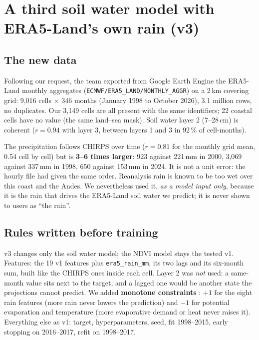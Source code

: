 \documentclass[11pt,a4paper]{article}
\begin{document}
\section{A third soil water model with ERA5-Land's own rain (v3)}\label{sec:v3}

\subsection{The new data}
Following our request, the team exported from Google Earth Engine the ERA5-Land monthly aggregates
(\texttt{ECMWF/ERA5\_LAND/MONTHLY\_AGGR}) on a 2\,km covering grid: 9,016 cells $\times$ 346 months (January 1998 to October
2026), 3.1 million rows, no duplicates. Our 3,149 cells are all present with the same identifiers; 22 coastal cells have no
value (the same land--sea mask). Soil water layer 2 (7--28\,cm) is coherent ($r=0.94$ with layer 3, between layers 1 and 3 in
92\,\% of cell-months).

The precipitation follows CHIRPS over time ($r=0.81$ for the monthly grid mean, 0.54 cell by cell) but is \textbf{3--6 times
larger}: 923 against 221\,mm in 2000, 3,069 against 337\,mm in 1998, 650 against 153\,mm in 2024. It is not a unit error:
the hourly file had given the same order. Reanalysis rain is known to be too wet over this coast and the Andes. We
nevertheless used it, \emph{as a model input only}, because it is the rain that drives the ERA5-Land soil water we predict;
it is never shown to users as ``the rain''.

\subsection{Rules written before training}
v3 changes only the soil water model; the NDVI model stays the tested v1. Features: the 19 v1 features plus
\texttt{era5\_rain\_mm}, its two lags and its six-month sum, built like the CHIRPS ones inside each cell. Layer 2 was
\emph{not} used: a same-month value sits next to the target, and a lagged one would be another state the projections
cannot predict. We added \textbf{monotone constraints} \citep{chen2016}: $+1$ for the eight rain features (more rain never
lowers the prediction) and $-1$ for potential evaporation and temperature (more evaporative demand or heat never raises
it). Everything else as v1: target, hyperparameters, seed, fit 1998--2015, early stopping on 2016--2017, refit on 1998--2017.
\end{document}
